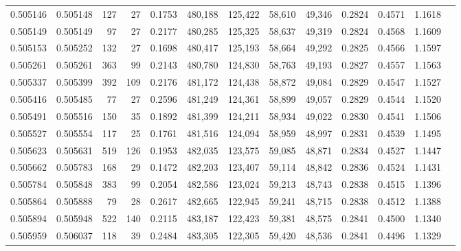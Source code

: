 \begin{tabular}{rrrrrrrrrrrrr}
0.505146 & 0.505148 &   127 &    27 &                                     0.1753 & 480,188 & 125,422 &  58,610 &  49,346 & 0.2824 & 0.4571 & 1.1618 \\
0.505149 & 0.505149 &    97 &    27 &                                     0.2177 & 480,285 & 125,325 &  58,637 &  49,319 & 0.2824 & 0.4568 & 1.1609 \\
0.505153 & 0.505252 &   132 &    27 &                                     0.1698 & 480,417 & 125,193 &  58,664 &  49,292 & 0.2825 & 0.4566 & 1.1597 \\
0.505261 & 0.505261 &   363 &    99 &                                     0.2143 & 480,780 & 124,830 &  58,763 &  49,193 & 0.2827 & 0.4557 & 1.1563 \\
0.505337 & 0.505399 &   392 &   109 &                                     0.2176 & 481,172 & 124,438 &  58,872 &  49,084 & 0.2829 & 0.4547 & 1.1527 \\
0.505416 & 0.505485 &    77 &    27 &                                     0.2596 & 481,249 & 124,361 &  58,899 &  49,057 & 0.2829 & 0.4544 & 1.1520 \\
0.505491 & 0.505516 &   150 &    35 &                                     0.1892 & 481,399 & 124,211 &  58,934 &  49,022 & 0.2830 & 0.4541 & 1.1506 \\
0.505527 & 0.505554 &   117 &    25 &                                     0.1761 & 481,516 & 124,094 &  58,959 &  48,997 & 0.2831 & 0.4539 & 1.1495 \\
0.505623 & 0.505631 &   519 &   126 &                                     0.1953 & 482,035 & 123,575 &  59,085 &  48,871 & 0.2834 & 0.4527 & 1.1447 \\
0.505662 & 0.505783 &   168 &    29 &                                     0.1472 & 482,203 & 123,407 &  59,114 &  48,842 & 0.2836 & 0.4524 & 1.1431 \\
0.505784 & 0.505848 &   383 &    99 &                                     0.2054 & 482,586 & 123,024 &  59,213 &  48,743 & 0.2838 & 0.4515 & 1.1396 \\
0.505864 & 0.505888 &    79 &    28 &                                     0.2617 & 482,665 & 122,945 &  59,241 &  48,715 & 0.2838 & 0.4512 & 1.1388 \\
0.505894 & 0.505948 &   522 &   140 &                                     0.2115 & 483,187 & 122,423 &  59,381 &  48,575 & 0.2841 & 0.4500 & 1.1340 \\
0.505959 & 0.506037 &   118 &    39 &                                     0.2484 & 483,305 & 122,305 &  59,420 &  48,536 & 0.2841 & 0.4496 & 1.1329 \\

\end{tabular}

